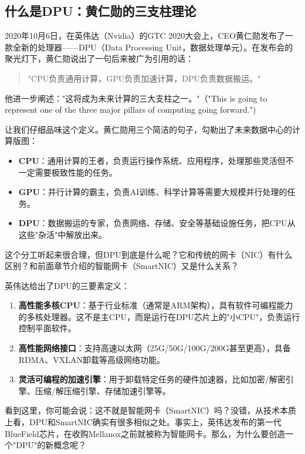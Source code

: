 \subsection{什么是DPU：黄仁勋的三支柱理论}

2020年10月6日，在英伟达（Nvidia）的GTC 2020大会上，CEO黄仁勋发布了一款全新的处理器——DPU（Data Processing Unit，数据处理单元）。在发布会的聚光灯下，黄仁勋说出了一句后来被广为引用的话：

\begin{quote}
"CPU负责通用计算，GPU负责加速计算，DPU负责数据搬运。"
\end{quote}

他进一步阐述："这将成为未来计算的三大支柱之一。"（"This is going to represent one of the three major pillars of computing going forward.")

让我们仔细品味这个定义。黄仁勋用三个简洁的句子，勾勒出了未来数据中心的计算版图：

\begin{itemize}
    \item \textbf{CPU}：通用计算的王者，负责运行操作系统、应用程序，处理那些灵活但不一定需要极致性能的任务。
    \item \textbf{GPU}：并行计算的霸主，负责AI训练、科学计算等需要大规模并行处理的任务。
    \item \textbf{DPU}：数据搬运的专家，负责网络、存储、安全等基础设施任务，把CPU从这些"杂活"中解放出来。
\end{itemize}

这个分工听起来很合理，但DPU到底是什么呢？它和传统的网卡（NIC）有什么区别？和前面章节介绍的智能网卡（SmartNIC）又是什么关系？

英伟达给出了DPU的三要素定义：

\begin{enumerate}
    \item \textbf{高性能多核CPU}：基于行业标准（通常是ARM架构），具有软件可编程能力的多核处理器。这不是主CPU，而是运行在DPU芯片上的"小CPU"，负责运行控制平面软件。
    \item \textbf{高性能网络接口}：支持高速以太网（25G/50G/100G/200G甚至更高），具备RDMA、VXLAN卸载等高级网络功能。
    \item \textbf{灵活可编程的加速引擎}：用于卸载特定任务的硬件加速器，比如加密/解密引擎、压缩/解压缩引擎、存储加速引擎等。
\end{enumerate}

看到这里，你可能会说：这不就是智能网卡（SmartNIC）吗？没错，从技术本质上看，DPU和SmartNIC确实有很多相似之处。事实上，英伟达发布的第一代BlueField芯片，在收购Mellanox之前就被称为智能网卡。那么，为什么要创造一个"DPU"的新概念呢？

